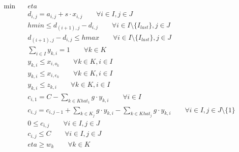 \begin{align}
  \min\quad & \mathit{eta} \tag{eq\_0017} \\
  & d_{i,j} = a_{i,j} + s \cdot x_{i,j} \qquad \forall i \in I, j \in J \tag{eq\_0001} \\
  & hmin \leq d_{\left(i + 1\right),j} - d_{i,j} \qquad \forall i \in I \setminus \{ I_{last} \}, j \in J \tag{eq\_0003\_a} \\
  & d_{\left(i + 1\right),j} - d_{i,j} \leq hmax \qquad \forall i \in I \setminus \{ I_{last} \}, j \in J \tag{eq\_0003\_b} \\
  & \sum_{i \in I} y_{k,i} = 1 \qquad \forall k \in K \tag{eq\_0004} \\
  & y_{k,i} \leq x_{i,o_{k}} \qquad \forall k \in K, i \in I \tag{eq\_0005} \\
  & y_{k,i} \leq x_{i,e_{k}} \qquad \forall k \in K, i \in I \tag{eq\_0006} \\
  & y_{k,i} \leq z_{k,i} \qquad \forall k \in K, i \in I \tag{eq\_0009} \\
  & c_{i,1} = C - \sum_{k \in Khat_1} g \cdot y_{k,i} \qquad \forall i \in I \tag{eq\_0012} \\
  & c_{i,j} = c_{i,j-1} + \sum_{k \in K_j} g \cdot y_{k,i} - \sum_{k \in Khat_j} g \cdot y_{k,i} \qquad \forall i \in I, j \in J \setminus \{1\} \tag{eq\_0013} \\
  & 0 \leq c_{i,j} \qquad \forall i \in I, j \in J \tag{eq\_0014\_a} \\
  & c_{i,j} \leq C \qquad \forall i \in I, j \in J \tag{eq\_0014\_b} \\
  & \mathit{eta} \geq w_{k} \qquad \forall k \in K \tag{eq\_0020} \\
\end{align}
